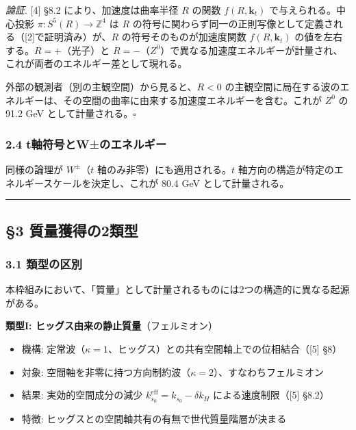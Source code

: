 \documentclass[
  a4paper,11pt]{ltjsarticle}
\providecommand{\tightlist}{%
  \setlength{\itemsep}{0pt}\setlength{\parskip}{0pt}}
\theoremstyle{definition}
\theoremstyle{remark}
\begin{document}
\emph{論証}. {[}4{]} §8.2 により、加速度は曲率半径 \(R\) の関数
\(f(R, \mathbf{k}_t)\) で与えられる。中心投影
\(\pi: S^5(R) \to \mathbb{Z}^4\) は \(R\)
の符号に関わらず同一の正則写像として定義される（{[}2{]}で証明済み）が、\(R\)
の符号そのものが加速度関数 \(f(R, \mathbf{k}_t)\)
の値を左右する。\(R = +\)（光子）と
\(R = -\)（\(Z^0\)）で異なる加速度エネルギーが計量され、これが両者のエネルギー差として現れる。

外部の観測者（別の主観空間）から見ると、\(R < 0\)
の主観空間に局在する波のエネルギーは、その空間の曲率に由来する加速度エネルギーを含む。これが
\(Z^0\) の 91.2 GeV として計量される。\(\square\)

\subsubsection{2.4
t軸符号とW±のエネルギー}\label{tux8ef8ux7b26ux53f7ux3068wux306eux30a8ux30cdux30ebux30aeux30fc}

同様の論理が \(W^{\pm}\)（\(t\) 軸のみ非零）にも適用される。\(t\)
軸方向の構造が特定のエネルギースケールを決定し、これが 80.4 GeV
として計量される。

\begin{center}\rule{0.5\linewidth}{0.5pt}\end{center}

\subsection{§3
質量獲得の2類型}\label{ux8ceaux91cfux7372ux5f97ux306e2ux985eux578b}

\subsubsection{3.1 類型の区別}\label{ux985eux578bux306eux533aux5225}

本枠組みにおいて、「質量」として計量されるものには2つの構造的に異なる起源がある。

\textbf{類型I: ヒッグス由来の静止質量}（フェルミオン）

\begin{itemize}
\tightlist
\item
  機構:
  定常波（\(\kappa = 1\)、ヒッグス）との共有空間軸上での位相結合（{[}5{]}
  §8）
\item
  対象:
  空間軸を非零に持つ方向制約波（\(\kappa = 2\)）、すなわちフェルミオン
\item
  結果: 実効的空間成分の減少
  \(k_{s_0}^{\text{eff}} = k_{s_0} - \delta k_H\)
  による速度制限（{[}5{]} §8.2）
\item
  特徴: ヒッグスとの空間軸共有の有無で世代質量階層が決まる
\end{itemize}
\end{document}
